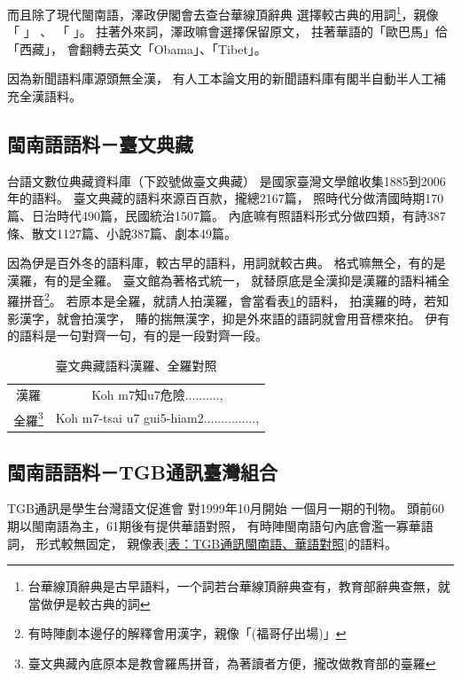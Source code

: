 而且除了現代閩南語，澤政伊閣會去查台華線頂辭典\cite{台華線頂辭典}
選擇較古典的用詞\footnote{台華線頂辭典是古早語料，一个詞若台華線頂辭典查有，教育部辭典查無，就當做伊是較古典的詞}，親像
「
」
、
「
」。
拄著外來詞，澤政嘛會選擇保留原文，
拄著華語的「歐巴馬」佮「西藏」，
會翻轉去英文「Obama」、「Tibet」。

因為新聞語料庫源頭無全漢，
有人工本論文用的新聞語料庫有閣半自動半人工補充全漢語料。


\subsection{閩南語語料－臺文典藏}
\label{節：臺文典藏}
台語文數位典藏資料庫（下跤號做臺文典藏）\cite{台語文數位典藏資料庫}
是國家臺灣文學館收集1885到2006年的語料。
臺文典藏的語料來源百百款，攏總2167篇，
照時代分做清國時期170篇、日治時代490篇，民國統治1507篇。
內底嘛有照語料形式分做四類，有詩387條、散文1127篇、小說387篇、劇本49篇。%

因為伊是百外冬的語料庫，較古早的語料，用詞就較古典。
格式嘛無仝，有的是漢羅，有的是全羅。
臺文館為著格式統一，
就替原底是全漢抑是漢羅的語料補全羅拼音\footnote{有時陣劇本邊仔的解釋會用漢字，親像「(福哥仔出場)」}。
若原本是全羅，就請人拍漢羅，會當看表\ref{表：臺文典藏語料}的語料，
拍漢羅的時，若知影漢字，就會拍漢字，
賰的揣無漢字，抑是外來語的語詞就會用音標來拍。
伊有的語料是一句對齊一句，有的是一段對齊一段。

\begin{table}
\caption{臺文典藏語料漢羅、全羅對照}
\label{表：臺文典藏語料}
\centering
\begin{tabular}{c|c}
漢羅 & Koh m7知u7危險.........., \\
全羅\footnote{臺文典藏內底原本是教會羅馬拼音，為著讀者方便，攏改做教育部的臺羅} & Koh m7-tsai u7 gui5-hiam2...............,\\
\end{tabular}
\end{table}


\subsection{閩南語語料－TGB通訊臺灣組合}
\label{節：TGB通訊－臺灣組合}
TGB通訊\cite{TGB通訊}是學生台灣語文促進會
對1999年10月開始\cite{學生台灣語文促進會對1999年10月開始}
一個月一期的刊物。
頭前60期以閩南語為主，61期後有提供華語對照，
有時陣閩南語句內底會濫一寡華語詞，
形式較無固定，
親像表\ref{表：TGB通訊閩南語、華語對照}的語料。


